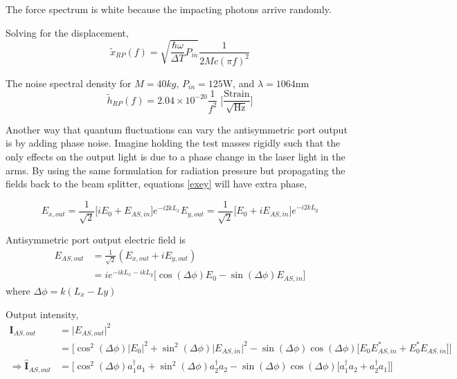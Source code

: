 		The force spectrum is white because the impacting photons arrive randomly.
		
		Solving for the displacement,
		\begin{equation}
		\tilde{x}_{RP}(f) = \sqrt{\frac{\hbar \omega}{\Delta T} P_{in}} \frac{1}{2Mc (\pi f)^2}
		\end{equation}
	
		The noise spectral density for $M=40kg$, $P_{in}=125$W, and $\lambda=1064$nm
		\begin{equation}
		\tilde{h}_{RP}(f) = 2.04\times 10^{-20} \frac{1}{f^2} \; \bigg[ \frac{\text{Strain}}{\sqrt{\text{Hz}}}\bigg]
		\end{equation}
		
		
		Another way that quantum fluctuations can vary the antisymmetric port output is by adding phase noise.  Imagine holding the test masses rigidly such that the only effects on the output light is due to a phase change in the laser light in the arms. By using the same formulation for radiation pressure but propagating the fields back to the beam splitter, equations \ref{exey} will have extra phase,
		
		\begin{subequations}\label{exeyout}
		\begin{equation}
		E_{x,out} = \frac{1}{\sqrt{2}} \bigg[ iE_0 +   E_{AS,in} \bigg] e^{-i2kL_x}
		\end{equation}
		\begin{equation}
		E_{y,out} = \frac{1}{\sqrt{2}} \bigg[  E_0 + i E_{AS,in} \bigg] e^{-i2kL_y}
		\end{equation}
		\end{subequations}
		
		Antisymmetric port output electric field is
		\begin{equation}
		\begin{aligned}
		E_{AS,out} 	&= \frac{1}{\sqrt{2}} (E_{x,out} + iE_{y,out})\\
					&= i e^{-ikL_x-ikL_y} \big[\cos(\Delta \phi) E_0 - \sin(\Delta \phi) E_{AS,in}\big]
		\end{aligned}
		\end{equation}
		where $\Delta \phi = k(L_x-Ly)$
		
		Output intensity,
		\begin{equation}
		\begin{aligned}
		\mathbf{I}_{AS,out} 		&= \vert E_{AS,out}\vert^2 \\
									&= \bigg[ \cos^2(\Delta \phi)\vert E_0\vert^2 + \sin^2(\Delta\phi)\vert E_{AS,in}\vert^2 - \sin(\Delta\phi)\cos(\Delta\phi) \big[E_0 E^*_{AS,in} + E_0^* E_{AS,in}\big] \bigg]\\
		\Rightarrow	
		\hat{\mathbf{I}}_{AS,out} 	&= \bigg[ \cos^2(\Delta \phi)a_1^{\dagger}a_1 + \sin^2(\Delta\phi)a_2^{\dagger}a_2 - \sin(\Delta\phi)\cos(\Delta \phi) \big[a_1^{\dagger}a_2 + a_2^{\dagger}a_1 \big] \bigg]\\	
		\end{aligned}
		\end{equation}
		

